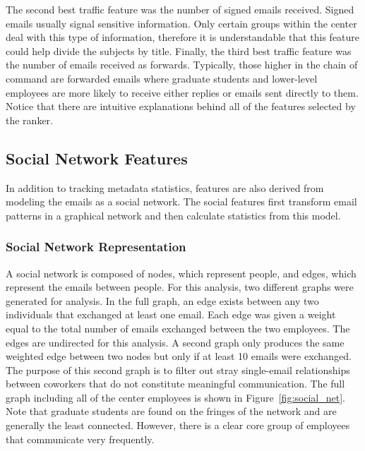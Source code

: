 \documentclass[12pt]{report}
\begin{document}
The second best traffic feature was the number of signed emails received.
Signed emails usually signal sensitive information.
Only certain groups within the center deal with this type of information, therefore it is understandable that this feature could help divide the subjects by title.
Finally, the third best traffic feature was the number of emails received as forwards.
Typically, those higher in the chain of command are forwarded emails where graduate students and lower-level employees are more likely to receive either replies or emails sent directly to them.
Notice that there are intuitive explanations behind all of the features selected by the ranker.


\subsection{Social Network Features}
In addition to tracking metadata statistics, features are also derived from modeling the emails as a social network.
The social features first transform email patterns in a graphical network and then calculate statistics from this model.


\subsubsection{Social Network Representation}
A social network is composed of nodes, which represent people, and edges, which represent the emails between people.
For this analysis, two different graphs were generated for analysis.
In the full graph, an edge exists between any two individuals that exchanged at least one email.
Each edge was given a weight equal to the total number of emails exchanged between the two employees.
The edges are undirected for this analysis.
A second graph only produces the same weighted edge between two nodes but only if at least 10 emails were exchanged.
The purpose of this second graph is to filter out stray single-email relationships between coworkers that do not constitute meaningful communication.
The full graph including all of the center employees is shown in Figure~\ref{fig:social_net}.  Note that graduate students are found on the fringes of the network and are generally the least connected.  However, there is a clear core group of employees that communicate very frequently.
\end{document}
